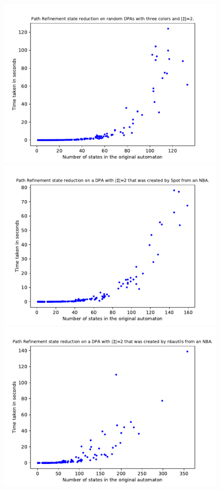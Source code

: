 \begin{figure}
	\centering
	\begin{minipage}{0.49\textwidth}
		\includegraphics[page=4,height=.3\textheight]{../data/analysis/path_refinement/gendet_ap1.pdf} 
		\includegraphics[page=4,height=.3\textheight]{../data/analysis/path_refinement/detspot_ap1.pdf} 
		\includegraphics[page=4,height=.3\textheight]{../data/analysis/path_refinement/detnbaut_ap1.pdf} 

\end{minipage}
\end{figure}
